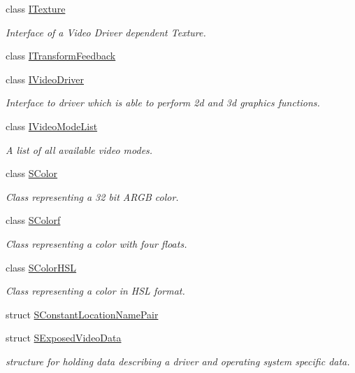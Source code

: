 \begin{DoxyCompactItemize}
class \hyperlink{classirr_1_1video_1_1ITexture}{I\+Texture}
\begin{DoxyCompactList}\small\item\em Interface of a Video Driver dependent Texture. \end{DoxyCompactList}\item 
class \hyperlink{classirr_1_1video_1_1ITransformFeedback}{I\+Transform\+Feedback}
\item 
class \hyperlink{classirr_1_1video_1_1IVideoDriver}{I\+Video\+Driver}
\begin{DoxyCompactList}\small\item\em Interface to driver which is able to perform 2d and 3d graphics functions. \end{DoxyCompactList}\item 
class \hyperlink{classirr_1_1video_1_1IVideoModeList}{I\+Video\+Mode\+List}
\begin{DoxyCompactList}\small\item\em A list of all available video modes. \end{DoxyCompactList}\item 
class \hyperlink{classirr_1_1video_1_1SColor}{S\+Color}
\begin{DoxyCompactList}\small\item\em Class representing a 32 bit A\+R\+GB color. \end{DoxyCompactList}\item 
class \hyperlink{classirr_1_1video_1_1SColorf}{S\+Colorf}
\begin{DoxyCompactList}\small\item\em Class representing a color with four floats. \end{DoxyCompactList}\item 
class \hyperlink{classirr_1_1video_1_1SColorHSL}{S\+Color\+H\+SL}
\begin{DoxyCompactList}\small\item\em Class representing a color in H\+SL format. \end{DoxyCompactList}\item 
struct \hyperlink{structirr_1_1video_1_1SConstantLocationNamePair}{S\+Constant\+Location\+Name\+Pair}
\item 
struct \hyperlink{structirr_1_1video_1_1SExposedVideoData}{S\+Exposed\+Video\+Data}
\begin{DoxyCompactList}\small\item\em structure for holding data describing a driver and operating system specific data. \end{DoxyCompactList}\item 

\end{DoxyCompactItemize}
